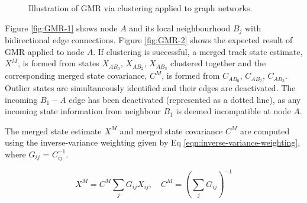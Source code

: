 \begin{figure}[htbp!] 
    \centering
    \hfill%
    \caption{Illustration of GMR via clustering applied to graph networks.}
    \label{fig:GMR-example}
\end{figure}


Figure \ref{fig:GMR-1} shows node $A$ and its local neighbourhood $B_j$ with bidirectional edge connections. Figure \ref{fig:GMR-2} shows the expected result of GMR applied to node $A$. If clustering is successful, a merged track state estimate, $X^M$, is formed from states $X_{AB_0}$, $X_{AB_2}$, $X_{AB_3}$ clustered together and the corresponding merged state covariance, $C^M$, is formed from $C_{AB_0}$, $C_{AB_2}$, $C_{AB_3}$. Outlier states are simultaneously identified and their edges are deactivated. The incoming $B_1 - A$ edge has been deactivated (represented as a dotted line), as any incoming state information from neighbour $B_1$ is deemed incompatible at node $A$.

The merged state estimate $X^{M}$ and merged state covariance $C^{M}$ are computed using the inverse-variance weighting \cite{inverse-variance-weighting} given by Eq \eqref{eqn:inverse-variance-weighting}, where $G_{ij}$ = $C_{ij}^{-1}$.

\begin{equation}
    X^{M} = C^{M} \sum_{j} G_{ij} X_{ij},  \quad  C^{M} = \left( \sum_{j} G_{ij} \right) ^{-1}
    \label{eqn:inverse-variance-weighting}
\end{equation}


